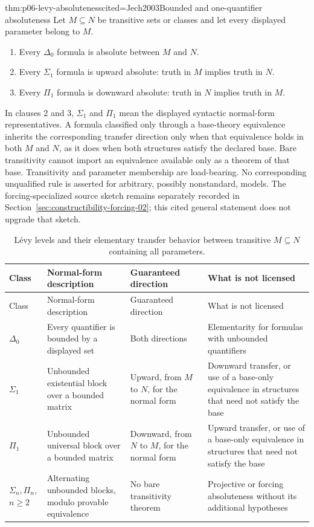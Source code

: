 \begin{hbtheorem}{thm:p06-levy-absoluteness}{cited=Jech2003}{Bounded and one-quantifier absoluteness}
Let \(M\subseteq N\) be transitive sets or classes and let every displayed
parameter belong to \(M\).
\begin{enumerate}
  \item Every \(\Delta_0\) formula is absolute between \(M\) and \(N\).
  \item Every \(\Sigma_1\) formula is upward absolute: truth in \(M\)
        implies truth in \(N\).
  \item Every \(\Pi_1\) formula is downward absolute: truth in \(N\)
        implies truth in \(M\).
\end{enumerate}
In clauses 2 and 3, \(\Sigma_1\) and \(\Pi_1\) mean the displayed syntactic
normal-form representatives.  A formula classified only through a
base-theory equivalence inherits the corresponding transfer direction only
when that equivalence holds in both \(M\) and \(N\), as it does when both
structures satisfy the declared base.  Bare transitivity cannot import an
equivalence available only as a theorem of that base.
Transitivity and parameter membership are load-bearing.  No corresponding
unqualified rule is asserted for arbitrary, possibly nonstandard, models.
The forcing-specialized source sketch remains separately recorded in
Section~\ref{sec:constructibility-forcing-02}; this cited general statement
does not upgrade that sketch.
\end{hbtheorem}

\begingroup\small
\begin{longtable}{@{}p{}p{}p{}p{}@{}}
\caption{L\'evy levels and their elementary transfer behavior between
transitive \(M\subseteq N\) containing all parameters.}
\label{tab:p06-levy-absoluteness}\\
\toprule
Class & Normal-form description & Guaranteed direction & What is not licensed \\
\midrule
\endfirsthead
\toprule
Class & Normal-form description & Guaranteed direction & What is not licensed \\
\midrule
\endhead
\(\Delta_0\) & Every quantifier is bounded by a displayed set & Both
directions & Elementarity for formulas with unbounded quantifiers \\
\(\Sigma_1\) & Unbounded existential block over a bounded matrix & Upward,
from \(M\) to \(N\), for the normal form & Downward transfer, or use of a
base-only equivalence in structures that need not satisfy the base \\
\(\Pi_1\) & Unbounded universal block over a bounded matrix & Downward,
from \(N\) to \(M\), for the normal form & Upward transfer, or use of a
base-only equivalence in structures that need not satisfy the base \\
\(\Sigma_n,\Pi_n\), \(n\geq2\) & Alternating unbounded blocks, modulo
provable equivalence & No bare transitivity theorem & Projective or forcing
absoluteness without its additional hypotheses \\
\bottomrule
\end{longtable}
\endgroup


